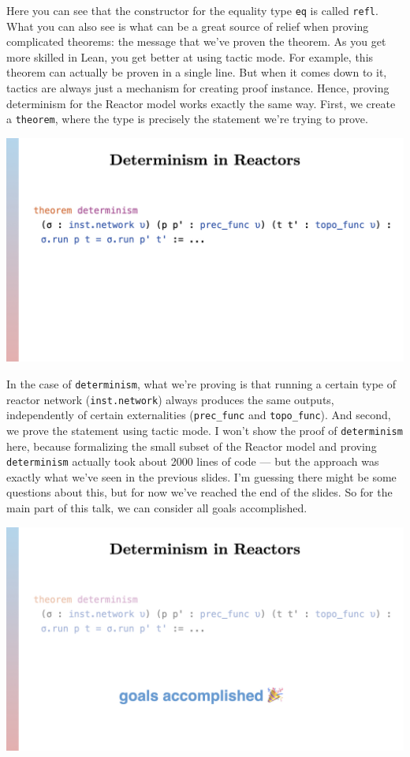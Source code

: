 \documentclass{article}
\begin{document}
Here you can see that the constructor for the equality type \lstinline{eq}
is called \lstinline{refl}. What you can also see is what can be a great
source of relief when proving complicated theorems: the message that
we've proven the theorem. As you get more skilled in Lean, you get
better at using tactic mode. For example, this theorem can actually be
proven in a single line. But when it comes down to it, tactics are
always just a mechanism for creating proof instance. Hence, proving
determinism for the Reactor model works exactly the same way. First, we
create a \lstinline{theorem}, where the type is precisely the statement
we're trying to prove.

\begin{center}
  \includegraphics[width=\columnwidth]{Slides/Slide 19.jpeg}
\end{center}

In the case of \lstinline{determinism}, what we're proving is that running
a certain type of reactor network (\lstinline{inst.network}) always
produces the same outputs, independently of certain externalities
(\lstinline{prec_func} and \lstinline{topo_func}). And second, we prove the
statement using tactic mode. I won't show the proof of
\lstinline{determinism} here, because formalizing the small subset of the
Reactor model and proving \lstinline{determinism} actually took about 2000
lines of code --- but the approach was exactly what we've seen in the
previous slides. I'm guessing there might be some questions about this,
but for now we've reached the end of the slides. So for the main part of
this talk, we can consider all goals accomplished.

\begin{center}
  \includegraphics[width=\columnwidth]{Slides/Slide 20.jpeg}
\end{center}
\end{document}
